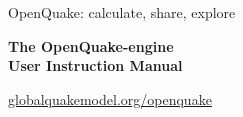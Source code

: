 \documentclass[11pt,fleqn]{book} %
\begin{document}





\begingroup
\thispagestyle{empty}
\begin{center}
\par\normalfont\fontsize{15}{15}\sffamily\selectfont
\textcolor{oqblue}{OpenQuake: calculate, share, explore}
\vspace*{9cm}
\par\bfseries\fontsize{35}{35}\sffamily\selectfont
\textcolor{gembrown}{The OpenQuake-engine\\User Instruction Manual}\par
\vspace*{9cm}
\par\normalfont\fontsize{15}{15}\sffamily\selectfont
\href{http://globalquakemodel.org/openquake/}{\textcolor{oqblue}{globalquakemodel.org/openquake}}
\end{center}
\endgroup


\newpage
~\vfill
\thispagestyle{empty}
\end{document}
